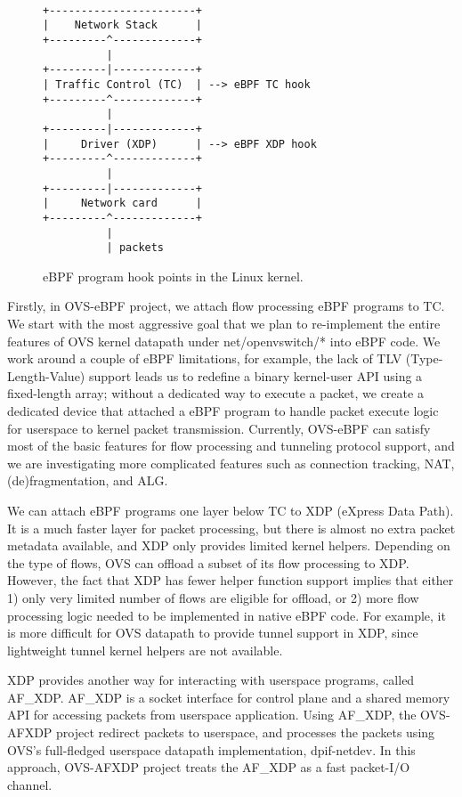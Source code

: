 \documentclass[10pt]{sigplanconf}
\begin{document}
\begin{figure}
{\scriptsize
\begin{verbatim}

+-----------------------+
|    Network Stack      |
+---------^-------------+
          |
+---------|-------------+
| Traffic Control (TC)  | --> eBPF TC hook
+---------^-------------+
          |
+---------|-------------+
|     Driver (XDP)      | --> eBPF XDP hook
+---------^-------------+
          |
+---------|-------------+
|     Network card      |
+---------^-------------+
          |
          | packets

\end{verbatim}
}
\vspace{-1.0em}
\caption{eBPF program hook points in the Linux kernel.}
\label{ebpf-hook}
\vspace{-1.0em}
\end{figure}

Firstly, in OVS-eBPF project, we attach flow processing eBPF programs to TC.
We start with the most aggressive goal that we plan to re-implement the entire
features of OVS kernel datapath under net/openvswitch/* into eBPF code.
We work around a couple of eBPF limitations, for example, the lack of TLV
(Type-Length-Value) support leads us to redefine a binary kernel-user API using
a fixed-length array; without a dedicated way to execute a packet, we
create a dedicated device that attached a eBPF program to handle packet
execute logic for userspace to kernel packet transmission.
Currently, OVS-eBPF can satisfy most of the basic features for flow processing
and tunneling protocol support, and we are investigating more complicated
features such as connection tracking, NAT, (de)fragmentation, and ALG.

We can attach eBPF programs one layer below TC to XDP (eXpress Data Path).
It is a much faster layer for packet processing, but there is almost no extra
packet metadata available, and XDP only provides limited kernel helpers.
Depending on the type of flows, OVS can offload a subset of its flow processing
to XDP. However, the fact that XDP has fewer helper function support implies
that either 1) only very limited number of flows are eligible for offload,
or 2) more flow processing logic needed to be implemented in native eBPF code.
For example, it is more difficult for OVS datapath to provide tunnel support in
XDP, since lightweight tunnel kernel helpers are not available.

XDP provides another way for interacting with userspace programs, called AF\_XDP. 
AF\_XDP is a socket interface for control plane and a shared memory API for
accessing packets from userspace application. Using AF\_XDP, the OVS-AFXDP project
redirect packets to userspace, and processes the packets using OVS's full-fledged
userspace datapath implementation, dpif-netdev. In this approach, OVS-AFXDP
project treats the AF\_XDP as a fast packet-I/O channel.
\end{document}
